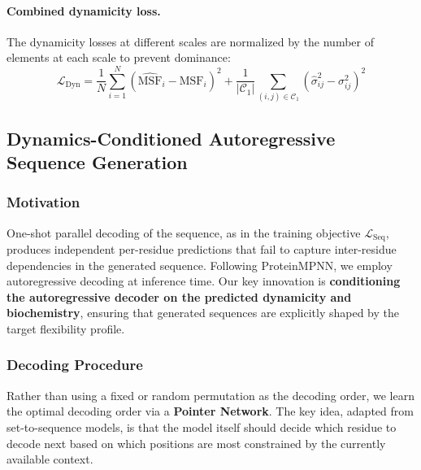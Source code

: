 \documentclass{article}
\begin{document}
\paragraph{Combined dynamicity loss.} The dynamicity losses at different scales are normalized by the number of elements at each scale to prevent dominance:
\begin{equation}
    \mathcal{L}_{\text{Dyn}} = \frac{1}{N} \sum_{i=1}^{N} (\widehat{\text{MSF}}_i - \text{MSF}_i)^2 + \frac{1}{|\mathcal{C}_1|} \sum_{(i,j) \in \mathcal{C}_1} (\hat{\sigma}^2_{ij} - \sigma^2_{ij})^2
\end{equation}

\subsection{Dynamics-Conditioned Autoregressive Sequence Generation}

\subsubsection{Motivation}
One-shot parallel decoding of the sequence, as in the training objective $\mathcal{L}_{\text{Seq}}$, produces independent per-residue predictions that fail to capture inter-residue dependencies in the generated sequence. Following ProteinMPNN, we employ autoregressive decoding at inference time. Our key innovation is \textbf{conditioning the autoregressive decoder on the predicted dynamicity and biochemistry}, ensuring that generated sequences are explicitly shaped by the target flexibility profile.

\subsubsection{Decoding Procedure}

Rather than using a fixed or random permutation as the decoding order, we learn the optimal decoding order via a \textbf{Pointer Network}. The key idea, adapted from set-to-sequence models, is that the model itself should decide which residue to decode next based on which positions are most constrained by the currently available context.
\end{document}
